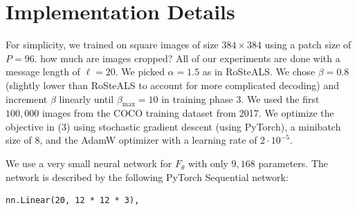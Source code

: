 \documentclass[twocolumn]{article}
\begin{document}
\section*{Implementation Details}
For simplicity, we trained on square images of size $384\times 384$ using a patch size of $P = 96$. \TODO how much are images cropped? All of our experiments are done with a message length of $\ell = 20$. We picked $\alpha = 1.5$ as in RoSteALS. We chose $\beta = 0.8$ (slightly lower than RoSteALS to account for more complicated decoding) and increment $\beta$ linearly until $\beta_{\mathrm{max}} = 10$ in training phase 3. We used the first $100{,}000$ images from the COCO training dataset from 2017. We optimize the objective in (3) using stochastic gradient descent (using PyTorch), a minibatch size of $8$, and the AdamW optimizer with a learning rate of $2\cdot 10^{-5}$.

We use a very small neural network for $F_\theta$ with only $9{,}168$ parameters. The network is described by the following PyTorch Sequential network: \TODO
\begin{verbatim}
nn.Linear(20, 12 * 12 * 3),
\end{verbatim}
\end{document}
